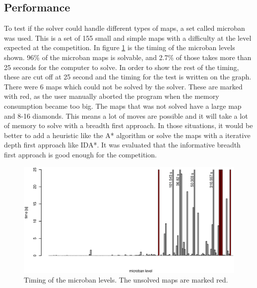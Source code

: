\subsection{Performance}
To test if the solver could handle different types of maps, a set called microban \cite{url:microban} was used.
This is a set of 155 small and simple maps with a difficulty at the level expected at the competition.
In figure \ref{fig:microban_timing} is the timing of the microban levels shown.
96\% of the microban maps is solvable, and 2.7\% of those takes more than 25 seconds for the computer to solve.
In order to show the rest of the timing, these are cut off at 25 second and the timing for the test is written on the graph.
There were 6 maps which could not be solved by the solver. These are marked with red, as the user manually aborted the program when the memory consumption became too big.
The maps that was not solved have a large map and 8-16 diamonds. 
This means a lot of moves are possible and it will take a lot of memory to solve with a breadth first approach.
In those situations, it would be better to add a heuristic like the A* algorithm or solve the maps with a iterative depth first approach like IDA*.
It was evaluated that the informative breadth first approach is good enough for the competition.

\begin{figure}[h]
 \centering
 \includegraphics[width=\textwidth]{img/micoban_timing.eps}
 \caption{Timing of the microban levels. The unsolved maps are marked red.}
 \label{fig:microban_timing}
\end{figure}
